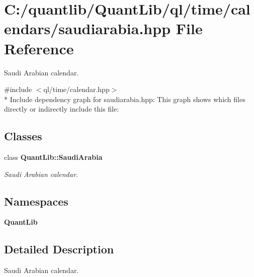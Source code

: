 \section{C\+:/quantlib/\+Quant\+Lib/ql/time/calendars/saudiarabia.hpp File Reference}
\label{saudiarabia_8hpp}


Saudi Arabian calendar.  


{\ttfamily \#include $<$ql/time/calendar.\+hpp$>$}\\*
Include dependency graph for saudiarabia.\+hpp\+:
This graph shows which files directly or indirectly include this file\+:
\subsection*{Classes}
\begin{DoxyCompactItemize}
\item 
class {\bf Quant\+Lib\+::\+Saudi\+Arabia}
\begin{DoxyCompactList}\small\item\em Saudi Arabian calendar. \end{DoxyCompactList}\end{DoxyCompactItemize}
\subsection*{Namespaces}
\begin{DoxyCompactItemize}
\item 
 {\bf Quant\+Lib}
\end{DoxyCompactItemize}


\subsection{Detailed Description}
Saudi Arabian calendar. 

